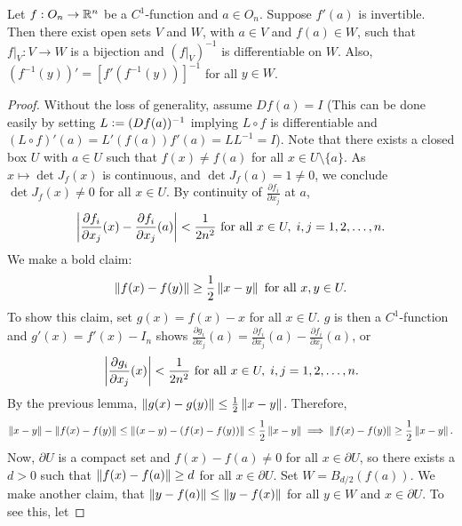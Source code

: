 \begin{theorem}
    Let $f:O_{n} \to \mathbb{R}^{n}$ be a $C^{1}$-function and $a \in O_{n}$. Suppose $f'(a)$ is invertible. Then there exist open sets $V$ and $W$, with $a \in V$ and $f(a) \in W$, such that $f|_{V} : V \to W$ is a bijection and $(f|_{V})^{-1}$ is differentiable on $W$. Also, $(f^{-1}(y))' = [f'(f^{-1}(y))]^{-1}$ for all $y \in W$.
\end{theorem}
\begin{proof}
    Without the loss of generality, assume $Df(a) = I$ (This can be done easily by setting $L\vcentcolon= (Df(a))^{-1}$ implying $L \circ f$ is differentiable and $(L \circ f)'(a) = L'(f(a))f'(a) = L L^{-1} = I$). Note that there exists a closed box $U$ with $a \in U$ such that $f(x) \neq f(a)$ for all $x \in U \setminus \{a\}$. As $x \mapsto \det J_{f}(x)$ is continuous, and $\det J_{f}(a) = 1 \neq 0$, we conclude $\det J_{f}(x) \neq 0$ for all $x \in U$. By continuity of $\frac{\partial f_{i}}{\partial x_{j}}$ at $a$,
    \begin{align}
        \left| \frac{\partial f_{i}}{\partial x_{j}}(x) - \frac{\partial f_{i}}{\partial x_{j}}(a) \right| < \frac{1}{2n^{2}} \text{ for all } x \in U,\; i,j = 1,2,\ldots,n.
    \end{align}
    We make a bold claim:
    \begin{align}
        \left\lVert f(x)-f(y)\right\rVert \geq \frac{1}{2} \left\lVert x-y\right\rVert \text{ for all } x,y \in U.
    \end{align}
    To show this claim, set $g(x) = f(x) - x$ for all $x \in U$. $g$ is then a $C^{1}$-function and $g'(x) = f'(x)-I_{n}$ shows $\frac{\partial g_{i}}{\partial x_{j}}(a) = \frac{\partial f_{i}}{\partial x_{j}}(a) - \frac{\partial f_{i}}{\partial x_{j}}(a)$, or
    \begin{align}
        \left| \frac{\partial g_{i}}{\partial x_{j}}(x) \right| < \frac{1}{2n^{2}} \text{ for all } x \in U,\; i,j = 1,2,\ldots,n.
    \end{align}
    By the previous lemma, $\left\lVert g(x)-g(y)\right\rVert \leq \frac{1}{2} \left\lVert x-y\right\rVert$. Therefore,
    \begin{align}
        \left\lVert x-y\right\rVert -\left\lVert f(x)-f(y)\right\rVert \leq \left\lVert(x-y)-(f(x)-f(y))\right\rVert \leq \frac{1}{2}\left\lVert x-y\right\rVert \implies \left\lVert f(x)-f(y)\right\rVert \geq \frac{1}{2} \left\lVert x-y\right\rVert.
    \end{align}
    Now, $\partial U$ is a compact set and $f(x) - f(a) \neq 0$ for all $x \in \partial U$, so there exists a $d > 0$ such that $\left\lVert f(x)-f(a)\right\rVert \geq d$ for all $x \in \partial U$. Set $W = B_{d/2}(f(a))$. We make another claim, that $\left\lVert y-f(a)\right\rVert \leq \left\lVert y-f(x)\right\rVert$ for all $y \in W$ and $x \in \partial U$. To see this, let

\end{proof}
